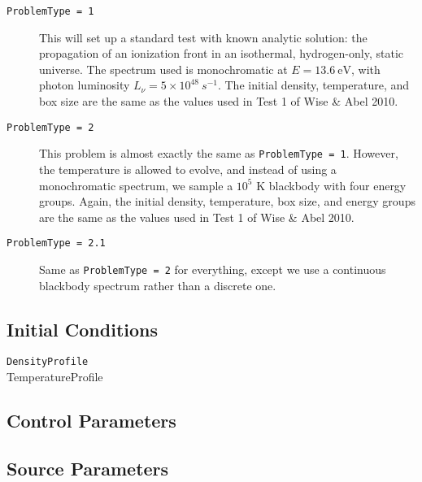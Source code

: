 \documentclass[letterpaper,titlepage,12pt]{article}
\numberwithin{equation}{section}
\begin{document}
\begin{description}
    
\item [\texttt{ProblemType = 1}] This will set up a standard test with known analytic solution: the propagation of an ionization front in an isothermal, hydrogen-only, static universe.  The spectrum used is monochromatic at $E = 13.6 \ \text{eV}$, with photon luminosity $L_{\nu} = 5\times 10^{48} \ s^{-1}$.  The initial density, temperature, and box size are the same as the values used in Test 1 of Wise \& Abel 2010. 

\item [\texttt{ProblemType = 2}] This problem is almost exactly the same as \texttt{ProblemType = 1}.  However, the temperature is allowed to evolve, and instead of using a monochromatic spectrum, we sample a $10^5$ K blackbody with four energy groups.  Again, the initial density, temperature, box size, and energy groups are the same as the values used in Test 1 of Wise \& Abel 2010.  

\item [\texttt{ProblemType = 2.1}] Same as \texttt{ProblemType = 2} for everything, except we use a continuous blackbody spectrum rather than a discrete one.

\end{description}

\subsection{Initial Conditions}
\begin{description}
    
\item [\texttt{DensityProfile}]  

\item [TemperatureProfile]  

\end{description}


\subsection{Control Parameters}


\subsection{Source Parameters}
\end{document}
